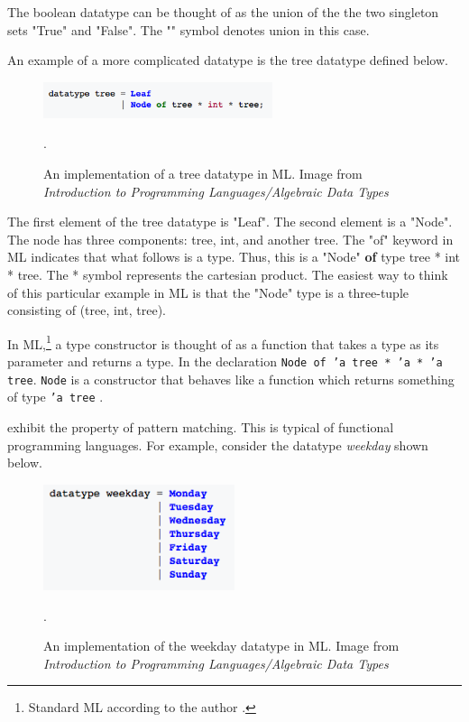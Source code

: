 \documentclass[../../main/main.tex]{subfiles}
\begin{document}
The boolean datatype can be thought of as the union of the the two singleton sets "True" and "False".  The "\textbar" symbol denotes union in this case.  

An example of a more complicated datatype is the tree datatype defined below.

\begin{figure}[h]
\centering
\includegraphics[width=0.6\textwidth]{../figures/tree}
\caption{\label{tree} An implementation of a tree datatype in ML.  Image from \textit{Introduction to Programming Languages/Algebraic Data Types} \cite{types} }.  
\end{figure}

The first element of the tree datatype is "Leaf".  The second element is a "Node".  The node has three components: tree, int, and another tree.  The "of" keyword in ML indicates that what follows is a type.  Thus, this is a "Node" \textbf{of} type tree * int * tree.  The * symbol represents the cartesian product.  The easiest way to think of this particular example in ML is that the "Node" type is a three-tuple consisting of (tree, int, tree).

In ML,\footnote{Standard ML according to the author \cite{constructor}.} a type constructor is thought of as a function that takes a type as its parameter and returns a type.  In the declaration \texttt{Node of 'a tree * 'a * 'a tree}. \texttt{Node} is a constructor that behaves like a function which returns something of type \texttt{'a tree} \cite{constructor}.


 exhibit the property of pattern matching.  This is typical of functional programming languages.  For example, consider the datatype \textit{weekday} shown below.

\begin{figure}[h]
\centering
\includegraphics[width=0.5\textwidth]{../figures/weekday}
\caption{\label{weekday} An implementation of the weekday datatype in ML.  Image from \textit{Introduction to Programming Languages/Algebraic Data Types} \cite{types} }.  
\end{figure}
\end{document}
